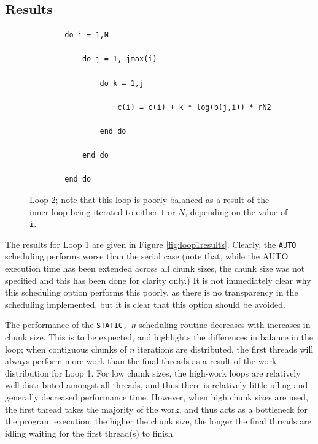 \documentclass{article} %
\newcommand{\tp}{\texttt}
\begin{document}
\subsection*{Results}



\begin{figure}
    \begin{lstlisting}
        do i = 1,N

            do j = 1, jmax(i) 
        
                do k = 1,j 
                    
                    c(i) = c(i) + k * log(b(j,i)) * rN2
                
                end do
            
            end do
     
        end do
    \end{lstlisting}
    \caption{Loop 2; note that this loop is poorly-balanced as a result of the inner loop being iterated to either $1$ or $N$, depending on the value of \texttt{i}.}
    \label{listing:loop2}
\end{figure}

The results for Loop 1 are given in Figure \ref{fig:loop1results}. Clearly, the \tp{AUTO} scheduling performs worse than the serial case (note that, while the AUTO execution time has been extended across all chunk sizes, the chunk size was not specified and this has been done for clarity only.)
It is not immediately clear why this scheduling option performs this poorly, as there is no transparency in the scheduling implemented, but it is clear that this option should be avoided.

The performance of the \tp{STATIC, \textit{n}} scheduling routine decreases with increases in chunk size.
This is to be expected, and highlights the differences in balance in the loop; when contiguous chunks of $n$ iterations are distributed, the first threads will always perform more work than the final threads as a result of the work distribution for Loop 1.
For low chunk sizes, the high-work loops are relatively well-distributed amongst all threads, and thus there is relatively little idling and generally decreased performance time.
However, when high chunk sizes are used, the first thread takes the majority of the work, and thus acts as a bottleneck for the program execution: the higher the chunk size, the longer the final threads are idling waiting for the first thread(s) to finish.
\end{document}

